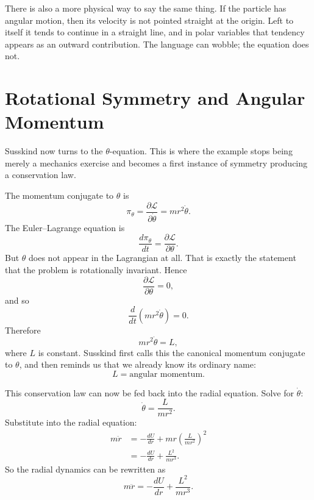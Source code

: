 There is also a more physical way to say the same thing. If the particle has angular motion, then its velocity is not pointed straight at the origin. Left to itself it tends to continue in a straight line, and in polar variables that tendency appears as an outward contribution. The language can wobble; the equation does not.

\section{Rotational Symmetry and Angular Momentum}

Susskind now turns to the \(\theta\)-equation. This is where the example stops being merely a mechanics exercise and becomes a first instance of symmetry producing a conservation law.

The momentum conjugate to \(\theta\) is
\begin{equation}
\pi_\theta=\frac{\partial \mathcal{L}}{\partial \dot\theta}=mr^2\dot\theta.
\end{equation}
The Euler--Lagrange equation is
\begin{equation}
\frac{d\pi_\theta}{dt}=\frac{\partial \mathcal{L}}{\partial \theta}.
\end{equation}
But \(\theta\) does not appear in the Lagrangian at all. That is exactly the statement that the problem is rotationally invariant. Hence
\begin{equation}
\frac{\partial \mathcal{L}}{\partial \theta}=0,
\end{equation}
and so
\begin{equation}
\frac{d}{dt}\left(mr^2\dot\theta\right)=0.
\end{equation}
Therefore
\begin{equation}
mr^2\dot\theta=L,
\end{equation}
where \(L\) is constant. Susskind first calls this the canonical momentum conjugate to \(\theta\), and then reminds us that we already know its ordinary name:
\begin{equation}
L=\text{angular momentum}.
\end{equation}

This conservation law can now be fed back into the radial equation. Solve for \(\dot\theta\):
\begin{equation}
\dot\theta=\frac{L}{mr^2}.
\end{equation}
Substitute into the radial equation:
\begin{align}
m\ddot r
&=
-\frac{dU}{dr}
+
mr
\left(
\frac{L}{mr^2}
\right)^2 \\
&=
-\frac{dU}{dr}
+
\frac{L^2}{mr^3}.
\end{align}
So the radial dynamics can be rewritten as
\begin{equation}
m\ddot r=-\frac{dU}{dr}+\frac{L^2}{mr^3}.
\end{equation}

